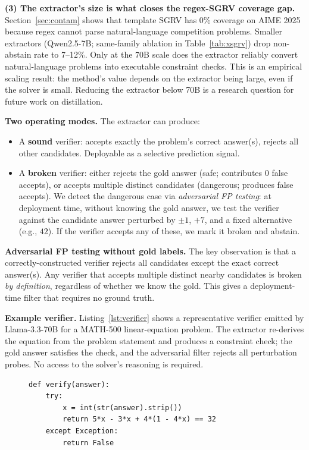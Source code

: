 \documentclass{article}
\begin{document}
\textbf{(3) The extractor's size is what closes the regex-SGRV coverage gap.} Section~\ref{sec:contam} shows that template SGRV has 0\% coverage on AIME 2025 because regex cannot parse natural-language competition problems. Smaller extractors (Qwen2.5-7B; same-family ablation in Table~\ref{tab:xsgrv}) drop non-abstain rate to 7--12\%. Only at the 70B scale does the extractor reliably convert natural-language problems into executable constraint checks. This is an empirical scaling result: the method's value depends on the extractor being large, even if the solver is small. Reducing the extractor below 70B is a research question for future work on distillation.

\textbf{Two operating modes.} The extractor can produce:
\begin{itemize}[leftmargin=*,itemsep=1pt]
\item A \textbf{sound} verifier: accepts exactly the problem's correct answer(s), rejects all other candidates. Deployable as a selective prediction signal.
\item A \textbf{broken} verifier: either rejects the gold answer (safe; contributes 0 false accepts), or accepts multiple distinct candidates (dangerous; produces false accepts). We detect the dangerous case via \emph{adversarial FP testing}: at deployment time, without knowing the gold answer, we test the verifier against the candidate answer perturbed by $\pm 1$, $+7$, and a fixed alternative (e.g., $42$). If the verifier accepts any of these, we mark it broken and abstain.
\end{itemize}

\textbf{Adversarial FP testing without gold labels.} The key observation is that a correctly-constructed verifier rejects all candidates except the exact correct answer(s). Any verifier that accepts multiple distinct nearby candidates is broken \emph{by definition}, regardless of whether we know the gold. This gives a deployment-time filter that requires no ground truth.

\textbf{Example verifier.} Listing~\ref{lst:verifier} shows a representative verifier emitted by Llama-3.3-70B for a MATH-500 linear-equation problem. The extractor re-derives the equation from the problem statement and produces a constraint check; the gold answer satisfies the check, and the adversarial filter rejects all perturbation probes. No access to the solver's reasoning is required.

\begin{figure}[t]
\begin{lstlisting}[style=xsgrv,caption={Representative X-SGRV verifier emitted by Llama-3.3-70B for a MATH-500 linear-equation problem. The extractor re-derives the constraint from the problem statement; the deployment-time filter then probes the verifier against candidate perturbations (never the gold) to rule out broken verifiers.},label={lst:verifier}]
def verify(answer):
    try:
        x = int(str(answer).strip())
        return 5*x - 3*x + 4*(1 - 4*x) == 32
    except Exception:
        return False
\end{lstlisting}
\end{figure}
\end{document}
